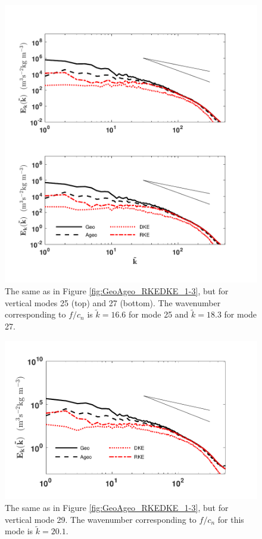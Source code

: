 \begin{figure}[H]
\includegraphics[scale=1]{Chapter4/img/GeoAgeo_RKEDKE_25-27}
\caption{The same as in Figure \ref{fig:GeoAgeo_RKEDKE_1-3}, but for vertical modes 25 (top) and 27 (bottom).  The wavenumber corresponding to $f/c_n$ is $\tilde{k} = 16.6$ for mode 25 and $\tilde{k} = 18.3$ for mode 27.}
\label{fig:GeoAgeo_RKEDKE_25-27}
\end{figure}

\begin{figure}[H]
\includegraphics[scale=1]{Chapter4/img/GeoAgeo_RKEDKE_29}
\caption{The same as in Figure \ref{fig:GeoAgeo_RKEDKE_1-3}, but for vertical mode 29.  The wavenumber corresponding to $f/c_n$ for this mode is $\tilde{k} = 20.1$.}
\label{fig:GeoAgeo_RKEDKE_29}
\end{figure}

